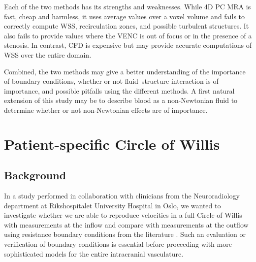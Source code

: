 Each of the two methods has its strengths and weaknesses. While 4D PC
MRA is fast, cheap and harmless, it uses average values over a voxel
volume and fails to correctly compute WSS, recirculation zones, and
possible turbulent structures. It also fails to provide values where
the VENC is out of focus or in the presence of a stenosis. In
contrast, CFD is expensive but may provide accurate computations of
WSS over the entire domain.

Combined, the two methods may give a better understanding of the
importance of boundary conditions, whether or not fluid--structure
interaction is of importance, and possible pitfalls using the
different methods. A first natural extension of this study may be to
describe blood as a non-Newtonian fluid to determine whether or not
non-Newtonian effects are of importance.

\section{Patient-specific Circle of Willis} \label{cok}

\subsection{Background}

In a study performed in collaboration with clinicians from the
Neuroradiology department at Riks\-hospitalet University Hospital in
Oslo, we wanted to investigate whether we are able to reproduce
velocities in a full Circle of Willis with measurements at the inflow
and compare with measurements at the outflow using resistance boundary
conditions from the
literature \citep{AlastrueyParkerPeiroEtAl2007,Vignon-ClementelFigueroaJansenEtAl2006}.
Such an evaluation or verification of boundary conditions is essential
before proceeding with more sophisticated models for the entire
intracranial vasculature.

